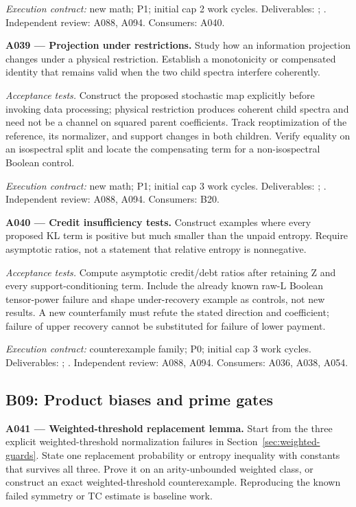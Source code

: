 \documentclass[11pt]{article}
\begin{document}
{\small\emph{Execution contract:} new math; P1; initial cap 2 work cycles. Deliverables: ; . Independent review: A088, A094. Consumers: A040.}

\textbf{A039 --- Projection under restrictions.} Study how an information projection changes under a physical restriction. Establish a monotonicity or compensated identity that remains valid when the two child spectra interfere coherently.

\emph{Acceptance tests.} Construct the proposed stochastic map explicitly before invoking data processing; physical restriction produces coherent child spectra and need not be a channel on squared parent coefficients. Track reoptimization of the reference, its normalizer, and support changes in both children. Verify equality on an isospectral split and locate the compensating term for a non-isospectral Boolean control.

{\small\emph{Execution contract:} new math; P1; initial cap 3 work cycles. Deliverables: ; . Independent review: A088, A094. Consumers: B20.}

\textbf{A040 --- Credit insufficiency tests.} Construct examples where every proposed KL term is positive but much smaller than the unpaid entropy. Require asymptotic ratios, not a statement that relative entropy is nonnegative.

\emph{Acceptance tests.} Compute asymptotic credit/debt ratios after retaining Z and every support-conditioning term. Include the already known raw-L Boolean tensor-power failure and shape under-recovery example as controls, not new results. A new counterfamily must refute the stated direction and coefficient; failure of upper recovery cannot be substituted for failure of lower payment.

{\small\emph{Execution contract:} counterexample family; P0; initial cap 3 work cycles. Deliverables: ; . Independent review: A088, A094. Consumers: A036, A038, A054.}

\subsection{B09: Product biases and prime gates}

\textbf{A041 --- Weighted-threshold replacement lemma.} Start from the three explicit weighted-threshold normalization failures in Section~\ref{sec:weighted-guards}. State one replacement probability or entropy inequality with constants that survives all three. Prove it on an arity-unbounded weighted class, or construct an exact weighted-threshold counterexample. Reproducing the known failed symmetry or TC estimate is baseline work.
\end{document}
